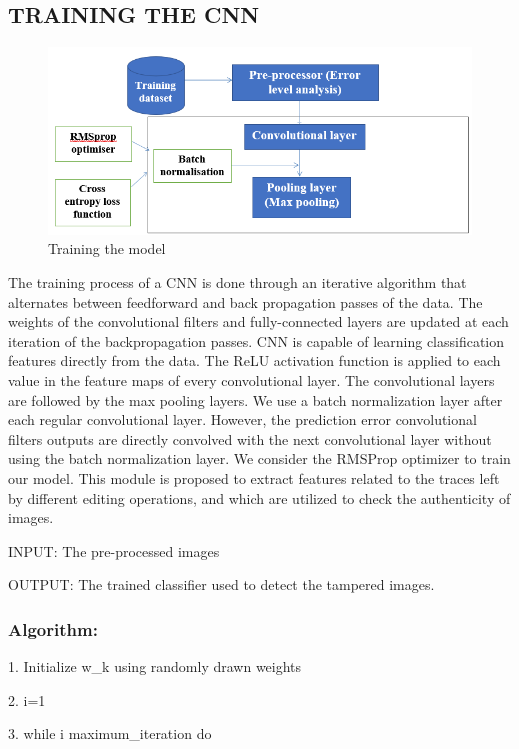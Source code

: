 \subsection{TRAINING THE CNN}
\begin{figure}[htp]
\centering
\includegraphics[scale=0.5,width=17cm]{Figures/training.png}
\caption{Training the model}
\label{fig:universe}
\end{figure}
The training process of a CNN is done through an iterative algorithm that alternates between feedforward  and back propagation passes of the data. The weights of the convolutional filters and fully-connected layers are updated at each iteration of the backpropagation passes. CNN is capable of learning classification features directly from the data. The ReLU activation function is applied to each value in the feature maps of every convolutional layer. The convolutional layers are followed by the max pooling layers. We use a batch normalization layer after each regular convolutional layer. However, the prediction error convolutional filters outputs are directly convolved with the next convolutional layer without using the batch normalization layer. We consider the RMSProp optimizer  to train our model. This module is proposed to extract features related to the traces left by different editing operations, and which are utilized to check the authenticity of images. 

INPUT: The pre-processed images 

OUTPUT: The trained classifier used to detect the tampered images. 

\subsubsection{Algorithm:} 
1.	Initialize w_k   using  randomly  drawn  weights

2.	i=1 

3.	while  i \leq  maximum\_iteration  do

